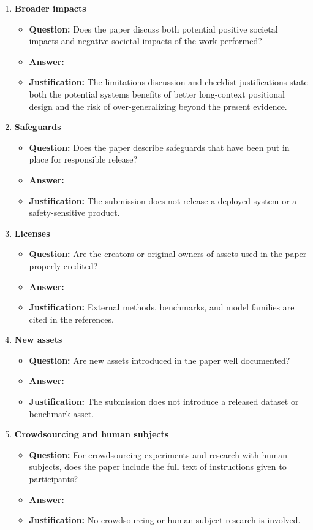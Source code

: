\documentclass{article}
\begin{document}
\begin{enumerate}
\item \textbf{Broader impacts}
\begin{itemize}
\item \textbf{Question:} Does the paper discuss both potential positive societal impacts and negative societal impacts of the work performed?
\item \textbf{Answer:} \answerYes{}
\item \textbf{Justification:} The limitations discussion and checklist justifications state both the potential systems benefits of better long-context positional design and the risk of over-generalizing beyond the present evidence.
\end{itemize}

\item \textbf{Safeguards}
\begin{itemize}
\item \textbf{Question:} Does the paper describe safeguards that have been put in place for responsible release?
\item \textbf{Answer:} \answerNA{}
\item \textbf{Justification:} The submission does not release a deployed system or a safety-sensitive product.
\end{itemize}

\item \textbf{Licenses}
\begin{itemize}
\item \textbf{Question:} Are the creators or original owners of assets used in the paper properly credited?
\item \textbf{Answer:} \answerYes{}
\item \textbf{Justification:} External methods, benchmarks, and model families are cited in the references.
\end{itemize}

\item \textbf{New assets}
\begin{itemize}
\item \textbf{Question:} Are new assets introduced in the paper well documented?
\item \textbf{Answer:} \answerNA{}
\item \textbf{Justification:} The submission does not introduce a released dataset or benchmark asset.
\end{itemize}

\item \textbf{Crowdsourcing and human subjects}
\begin{itemize}
\item \textbf{Question:} For crowdsourcing experiments and research with human subjects, does the paper include the full text of instructions given to participants?
\item \textbf{Answer:} \answerNA{}
\item \textbf{Justification:} No crowdsourcing or human-subject research is involved.
\end{itemize}


\end{enumerate}
\end{document}
